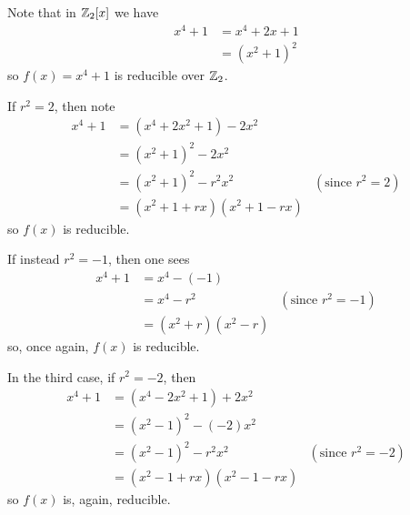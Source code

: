 \begin{questions}
\begin{partquestions}{\alph*}
        \item Note that in $\mathbb{Z}_2[x]$ we have
        \begin{align*}
            x^4 + 1 &= x^4 + 2x + 1\\
            &= (x^2+1)^2
        \end{align*}
        so $f(x) = x^4+1$ is reducible over $\mathbb{Z}_2$.
        
        \begin{partquestions}{\roman*}
            \item \begin{partquestions}{\alph*}
                \item If $r^2 = 2$, then note
                \begin{align*}
                    x^4 + 1 &= (x^4 + 2x^2 +1) - 2x^2\\
                    &= (x^2+1)^2 - 2x^2\\
                    &= (x^2+1)^2 - r^2x^2 & (\text{since } r^2 = 2)\\
                    &= (x^2+1+rx)(x^2+1-rx)
                \end{align*}
                so $f(x)$ is reducible.
                
                \item If instead $r^2 = -1$, then one sees
                \begin{align*}
                    x^4 + 1 &= x^4 - (-1)\\
                    &= x^4 - r^2 & (\text{since } r^2 = -1)\\
                    &= (x^2+r)(x^2-r)
                \end{align*}
                so, once again, $f(x)$ is reducible.
                
                \item In the third case, if $r^2 = -2$, then
                \begin{align*}
                    x^4 + 1 &= (x^4 - 2x^2 +1) + 2x^2\\
                    &= (x^2-1)^2 - (-2)x^2\\
                    &= (x^2-1)^2 - r^2x^2 & (\text{since } r^2 = -2)\\
                    &= (x^2-1+rx)(x^2-1-rx)
                \end{align*}
                so $f(x)$ is, again, reducible.
            \end{partquestions}


\end{partquestions}
\end{partquestions}
\end{questions}
